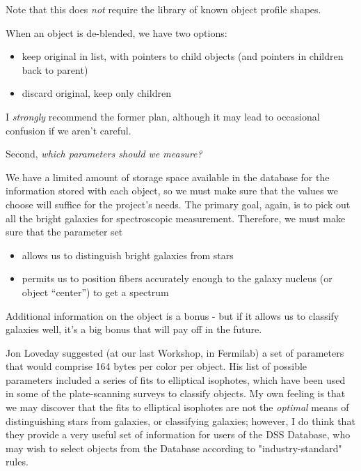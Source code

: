   Note that this does {\it not} require the library of 
known object profile shapes.

  When an object is de-blended, we have two options:

\begin{itemize}
  \item keep original in list, with pointers to child objects (and pointers
        in children back to parent)
  \item discard original, keep only children
\end{itemize}

  I {\it strongly} recommend the former plan, although it may
lead to occasional confusion if we aren't careful.

\medskip

  Second, {\it which parameters should we measure?}

We have a limited amount of storage space available in the database for
the information stored with each object, so we must make sure that the
values we choose will suffice for the project's needs.  The primary goal,
again, is to pick out all the bright galaxies for spectroscopic measurement.
Therefore, we must make sure that the parameter set

\begin {itemize}
    \item allows us to distinguish bright galaxies from stars
    \item permits us to position fibers accurately enough to the
            galaxy nucleus (or object ``center'') to get a spectrum
\end {itemize}

Additional information on the
object is a bonus - but if it allows us to classify galaxies well, it's
a big bonus that will pay off in the future.

  Jon Loveday suggested (at our last Workshop, in Fermilab) a set of
parameters that would comprise 164 bytes per color per object.
His list of possible parameters included a series of fits to
elliptical isophotes,
which have been used in some of the plate-scanning surveys to classify
objects.  My own feeling is that we may discover that the fits to 
elliptical isophotes are not the {\it optimal} means of distinguishing
stars from galaxies, or classifying galaxies; however, I do think that
they provide a very useful set of information for users of the DSS
Database, who may wish to select objects from the Database according
to "industry-standard" rules.  
 
